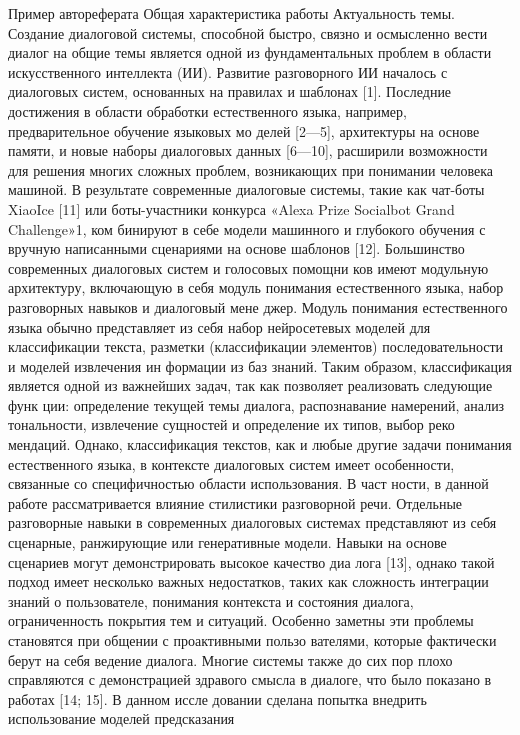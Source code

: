 \iffalse
Пример автореферата
Общая характеристика работы
Актуальность темы. Создание диалоговой системы, способной
быстро, связно и осмысленно вести диалог на общие темы является одной
из фундаментальных проблем в области искусственного интеллекта (ИИ).
Развитие разговорного ИИ началось с диалоговых систем, основанных
на правилах и шаблонах [1]. Последние достижения в области обработки
естественного языка, например, предварительное обучение языковых мо
делей [2—5], архитектуры на основе памяти, и новые наборы диалоговых
данных [6—10], расширили возможности для решения многих сложных
проблем, возникающих при понимании человека машиной. В результате
современные диалоговые системы, такие как чат-боты XiaoIce [11] или
боты-участники конкурса «Alexa Prize Socialbot Grand Challenge»1, ком
бинируют в себе модели машинного и глубокого обучения с вручную
написанными сценариями на основе шаблонов [12].
Большинство современных диалоговых систем и голосовых помощни
ков имеют модульную архитектуру, включающую в себя модуль понимания
естественного языка, набор разговорных навыков и диалоговый мене
джер. Модуль понимания естественного языка обычно представляет из
себя набор нейросетевых моделей для классификации текста, разметки
(классификации элементов) последовательности и моделей извлечения ин
формации из баз знаний. Таким образом, классификация является одной
из важнейших задач, так как позволяет реализовать следующие функ
ции: определение текущей темы диалога, распознавание намерений, анализ
тональности, извлечение сущностей и определение их типов, выбор реко
мендаций. Однако, классификация текстов, как и любые другие задачи
понимания естественного языка, в контексте диалоговых систем имеет
особенности, связанные со специфичностью области использования. В част
ности, в данной работе рассматривается влияние стилистики разговорной
речи.
Отдельные разговорные навыки в современных диалоговых системах
представляют из себя сценарные, ранжирующие или генеративные модели.
Навыки на основе сценариев могут демонстрировать высокое качество диа
лога [13], однако такой подход имеет несколько важных недостатков, таких
как сложность интеграции знаний о пользователе, понимания контекста и
состояния диалога, ограниченность покрытия тем и ситуаций. Особенно
заметны эти проблемы становятся при общении с проактивными пользо
вателями, которые фактически берут на себя ведение диалога. Многие
системы также до сих пор плохо справляются с демонстрацией здравого
смысла в диалоге, что было показано в работах [14; 15]. В данном иссле
довании сделана попытка внедрить использование моделей предсказания
